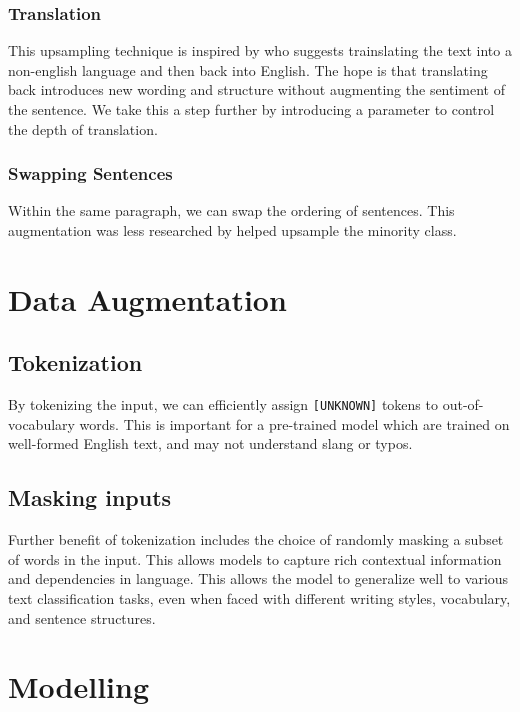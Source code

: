 \documentclass[11pt,a4paper]{article}
\begin{document}
\subsubsection{Translation}

This upsampling technique is inspired by \citet{nlp-imbalanced-data} who suggests trainslating the text into a non-english language and then back into English. The hope is that translating back introduces new wording and structure without augmenting the sentiment of the sentence. We take this a step further by introducing a parameter to control the depth of translation.

\subsubsection{Swapping Sentences}

Within the same paragraph, we can swap the ordering of sentences. This augmentation was less researched by helped upsample the minority class.

\section{Data Augmentation}

\subsection{Tokenization}

By tokenizing the input, we can efficiently assign \texttt{[UNKNOWN]} tokens to out-of-vocabulary words. This is important for a pre-trained model which are trained on well-formed English text, and may not understand slang or typos.

\subsection{Masking inputs}

Further benefit of tokenization includes the choice of randomly masking a subset of words in the input. This allows models to capture rich contextual information and dependencies in language. This allows the model to generalize well to various text classification tasks, even when faced with different writing styles, vocabulary, and sentence structures.

\section{Modelling}\label{sect:model}
\end{document}
